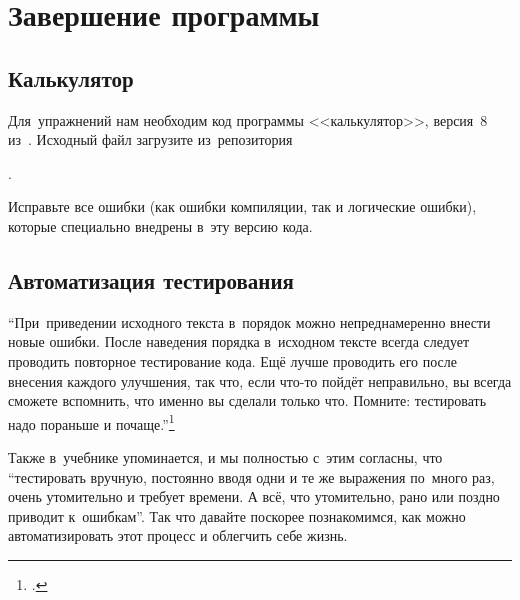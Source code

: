 
\chapter{Завершение программы}

\section{Калькулятор}
Для~упражнений нам необходим код программы <<калькулятор>>, версия~8 из~. Исходный файл загрузите из~репозитория
\begin{center}
    .
\end{center}

Исправьте все ошибки (как ошибки компиляции, так и логические ошибки), которые специально внедрены в~эту версию кода.



\section{Автоматизация тестирования}\label{sect:autotests}
\enquote{При~приведении исходного текста в~порядок можно непреднамеренно внести новые ошибки. После наведения порядка в~исходном тексте всегда следует проводить повторное тестирование кода. Ещё лучше проводить его после внесения каждого улучшения, так что, если что-то пойдёт неправильно, вы всегда сможете вспомнить, что именно вы сделали только что. Помните: тестировать надо пораньше и почаще.}\footcite[глава~7, страница~282, последний абзац]{Stroustrup:2016:ru}

Также в~учебнике упоминается, и мы полностью с~этим согласны, что \enquote{тестировать вручную, постоянно вводя одни и те же выражения по~много раз, очень утомительно и требует времени. А всё, что утомительно, рано или поздно приводит к~ошибкам}. Так что давайте поскорее познакомимся, как можно автоматизировать этот процесс и облегчить себе жизнь.



